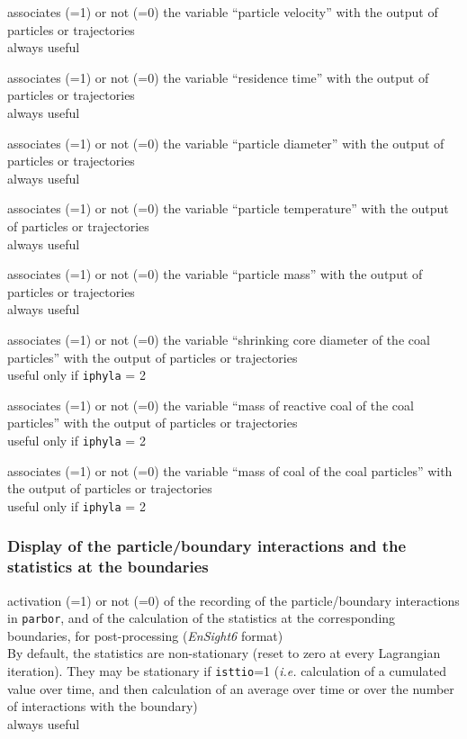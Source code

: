 {associates (=1) or not (=0) the variable ``particle velocity''
with the output of particles or trajectories\\
always useful}

{associates (=1) or not (=0) the variable ``residence time''
with the output of particles or trajectories\\
always useful}

{associates (=1) or not (=0) the variable ``particle diameter''
with the output of particles or trajectories\\
always useful}

{associates (=1) or not (=0) the variable ``particle temperature''
with the output of particles or trajectories\\
always useful}

{associates (=1) or not (=0) the variable ``particle mass''
with the output of particles or trajectories\\
always useful}

{associates (=1) or not (=0) the variable ``shrinking core diameter of
the coal particles'' with the output of particles or trajectories\\
useful only if \texttt{iphyla} = 2}

{associates (=1) or not (=0) the variable ``mass of reactive coal of the
coal particles'' with the output of particles or trajectories\\
useful only if \texttt{iphyla} = 2}

{associates (=1) or not (=0) the variable ``mass of coal of the
coal particles'' with the output of particles or trajectories\\
useful only if \texttt{iphyla} = 2}

\subsubsection{Display of the particle/boundary interactions and the statistics at the boundaries}

{activation (=1) or not (=0) of the recording of the particle/boundary
interactions in  \texttt{parbor}, and of the calculation of the
statistics at the corresponding boundaries, for post-processing
(\textit{EnSight6} format)\\
By default, the statistics are non-stationary (reset to zero at every
Lagrangian iteration). They may be stationary if \texttt{isttio}=1 ({\em i.e.}
calculation of a cumulated value over time, and then calculation of an
average over time or over the number of interactions with the boundary)\\
always useful}

